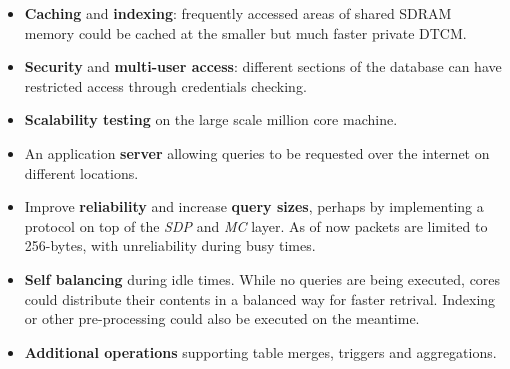 \begin{itemize}
	\item \textbf{Caching} and \textbf{indexing}: frequently accessed areas of shared SDRAM memory could be cached at the smaller but much faster private DTCM.
	\item \textbf{Security} and \textbf{multi-user access}: different sections of the database can have restricted access through credentials checking.
	\item \textbf{Scalability testing} on the large scale million core machine.
	\item An application \textbf{server} allowing queries to be requested over the internet on different locations.
	\item Improve \textbf{reliability} and increase \textbf{query sizes}, perhaps by implementing a protocol on top of the \textit{SDP} and \textit{MC} layer. As of now packets are limited to 256-bytes, with unreliability during busy times.
	\item \textbf{Self balancing} during idle times. While no queries are being executed, cores could distribute their contents in a balanced way for faster retrival. Indexing or other pre-processing could also be executed on the meantime.
	\item \textbf{Additional operations} supporting table merges, triggers and aggregations.
\end{itemize}